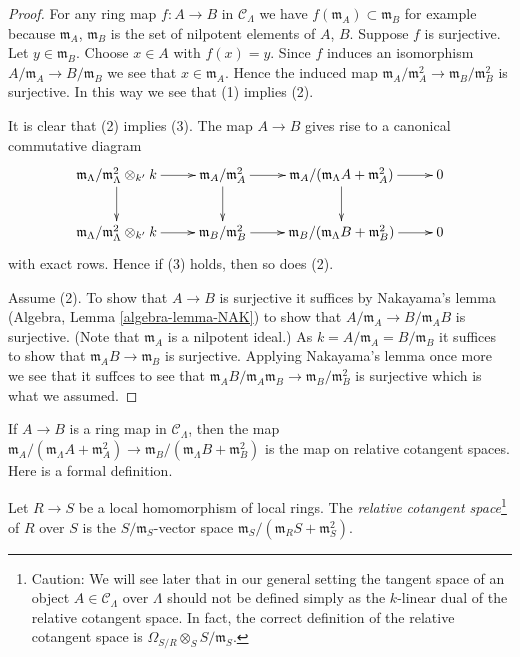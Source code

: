 \begin{proof}
For any ring map $f : A \to B$ in $\mathcal{C}_\Lambda$ we have
$f(\mathfrak m_A) \subset \mathfrak m_B$ for example because
$\mathfrak m_A$, $\mathfrak m_B$ is the set of nilpotent elements of
$A$, $B$. Suppose $f$ is surjective. Let $y \in \mathfrak m_B$.
Choose $x \in A$ with $f(x) = y$. Since $f$ induces an isomorphism
$A/\mathfrak m_A \to B/\mathfrak m_B$ we see that $x \in \mathfrak m_A$.
Hence the induced map
$\mathfrak m_A/\mathfrak m_A^2 \to \mathfrak m_B/\mathfrak m_B^2$
is surjective. In this way we see that (1) implies (2).

\medskip\noindent
It is clear that (2) implies (3). The map $A \to B$ gives rise
to a canonical commutative diagram
$$
\xymatrix{
\mathfrak m_\Lambda/\mathfrak m_\Lambda^2 \otimes_{k'} k \ar[r] \ar[d] &
\mathfrak m_A/\mathfrak m_A^2 \ar[r] \ar[d] &
\mathfrak m_A/(\mathfrak m_\Lambda A + \mathfrak m_A^2) \ar[r] \ar[d] & 0 \\
\mathfrak m_\Lambda/\mathfrak m_\Lambda^2 \otimes_{k'} k \ar[r] &
\mathfrak m_B/\mathfrak m_B^2 \ar[r] &
\mathfrak m_B/(\mathfrak m_\Lambda B + \mathfrak m_B^2) \ar[r] & 0
}
$$
with exact rows. Hence if (3) holds, then so does (2).

\medskip\noindent
Assume (2). To show that $A \to B$ is surjective it suffices by
Nakayama's lemma (Algebra, Lemma \ref{algebra-lemma-NAK})
to show that $A/\mathfrak m_A \to B/\mathfrak m_AB$ is surjective.
(Note that $\mathfrak m_A$ is a nilpotent ideal.)
As $k = A/\mathfrak m_A = B/\mathfrak m_B$ it suffices to show that
$\mathfrak m_AB \to \mathfrak m_B$ is surjective. Applying
Nakayama's lemma once more we see that it suffces to see that
$\mathfrak m_AB/\mathfrak m_A\mathfrak m_B \to \mathfrak m_B/\mathfrak m_B^2$
is surjective which is what we assumed.
\end{proof}

\noindent
If $A \to B$ is a ring map in $\mathcal{C}_\Lambda$, then the map
$\mathfrak m_A/(\mathfrak m_\Lambda A + \mathfrak m_A^2)
\to \mathfrak m_B/(\mathfrak m_\Lambda B + \mathfrak m_B^2)$
is the map on relative cotangent spaces. Here is a formal definition.

\begin{definition}
\label{definition-tangent-space-ring}
Let $R \to S$ be a local homomorphism of local rings. The
{\it relative cotangent space}\footnote{Caution: We will see later
that in our general setting the tangent
space of an object $A \in \mathcal{C}_\Lambda$ over $\Lambda$ should
not be defined simply as the $k$-linear dual of the relative
cotangent space. In fact, the correct definition of the relative
cotangent space is
$\Omega_{S/R} \otimes_S S/\mathfrak m_S$.} of $R$ over $S$ is the
$S/\mathfrak m_S$-vector space
$\mathfrak m_S/(\mathfrak m_R S + \mathfrak m_S^2)$.
\end{definition}

